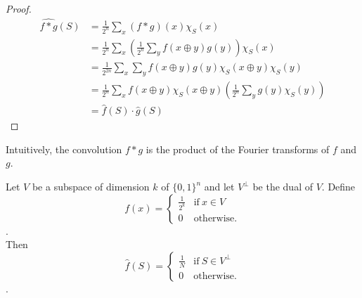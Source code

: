\begin{proof}
\begin{align*}
\widehat{f*g}(S) 
& = \frac{1}{2^n}\sum \limits_{x} (f*g)(x) \chi_S(x) \\
& = \frac{1}{2^n} \sum \limits_{x} \left( \frac{1}{2^n} 
	\sum\limits_{y} f(x \oplus y) g(y) \right) \chi_S(x) \\
& = \frac{1}{2^{2n}} \sum\limits_x  \sum\limits_y f(x \oplus y) g(y) 
	\chi_S(x \oplus y) \chi_S(y) \\
& = \frac{1}{2^n}\sum \limits_{x} f(x \oplus y) \chi_S(x \oplus y) 
	\left( \frac{1}{2^n}\sum \limits_{y} g(y) \chi_S(y) \right)\\
& = \widehat{f}(S) \cdot \widehat{g}(S)		
\end{align*}
\end{proof}

Intuitively, the convolution $f * g$ is the product of the Fourier transforms of $f$ and $g$.
\begin{theorem}
Let $V$ be a subspace of dimension $k$ of $\{ 0, 1 \}^n$ and let $V^\perp$ be the dual of $V$. Define \\
 $$f(x) =
\begin{cases}
	\frac{1}{2^k} & \text{if} \ x \in V \\
	0             & \text{otherwise}.
\end{cases}$$. \\
Then
$$\widehat{f}(S) =
\begin{cases}
	\frac{1}{N} & \text{if} \ S \in V^\perp \\
	0             & \text{otherwise}.
\end{cases}$$.
\end{theorem}

